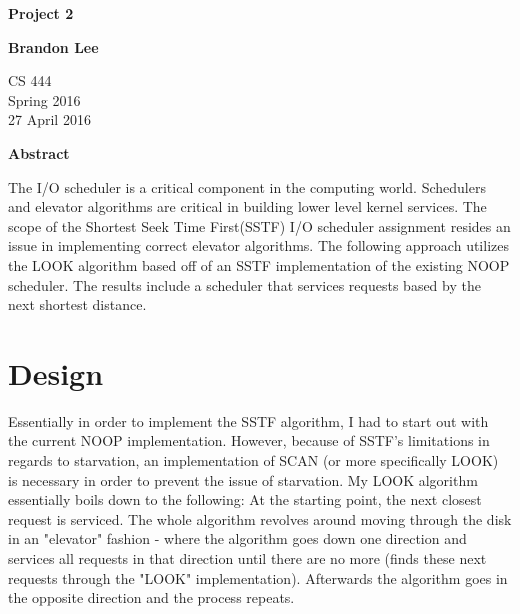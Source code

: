 \documentclass[letterpaper,10pt,titlepage]{article}
\begin{document}
\begin{titlepage}
    \begin{center}
        \vspace*{3.5cm}

        \textbf{Project 2}

        \vspace{0.5cm}

        \textbf{Brandon Lee}

        \vspace{0.8cm}

        CS 444\\
        Spring 2016\\
        27 April 2016\\

        \vspace{1cm}

        \textbf{Abstract}\\

        \vspace{0.5cm}

        The I/O scheduler is a critical component in the computing world.  Schedulers and elevator algorithms are critical in building lower level kernel services.  The scope of the Shortest Seek Time First(SSTF) I/O scheduler assignment resides an issue in implementing correct elevator algorithms. The following approach utilizes the LOOK algorithm based off of an SSTF implementation of the existing NOOP scheduler.  The results include a scheduler that services requests based by the next shortest distance.

        \vfill



    \end{center}
\end{titlepage}

\newpage

\section{Design}

Essentially in order to implement the SSTF algorithm, I had to start out with the current NOOP implementation. However, because of SSTF's limitations in regards to starvation, an implementation of SCAN (or more specifically LOOK) is necessary in order to prevent the issue of starvation.  My LOOK algorithm essentially boils down to the following: At the starting point, the next closest request is serviced. The whole algorithm revolves around moving through the disk in an "elevator" fashion - where the algorithm goes down one direction and services all requests in that direction until there are no more (finds these next requests through the "LOOK" implementation).  Afterwards the algorithm goes in the opposite direction and the process repeats.\\
\end{document}
